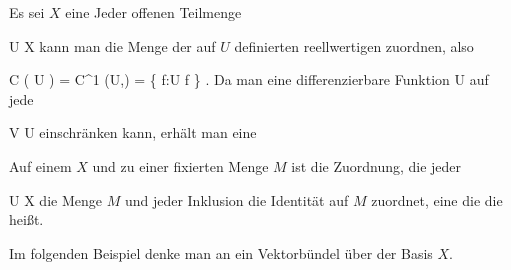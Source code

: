 {





Es sei $X$ eine
Jeder offenen Teilmenge

\mavergleichskette
{\vergleichskette
{U
}
{ \subseteq }{ X
}
{  }{
}
{    }{
}
{   }{
}
}
{}{}{}
kann man die Menge der auf $U$ definierten reellwertigen
zuordnen, also

\mavergleichskettedisp
{\vergleichskette
{ { \mathcal  C   }  \left(   U   \right)
}
{ =} { C^1 (U,\R)
}
{ =} { \left\{  f:U \rightarrow \R  \mid  f          \right\}
}
{ } {
}
{ } {
}
}
{}{}{.}
Da man eine differenzierbare Funktion
 { U } { \R
} {}
auf jede

\mavergleichskette
{\vergleichskette
{V
}
{ \subseteq }{ U
}
{  }{
}
{    }{
}
{   }{
}
}
{}{}{}
einschränken kann, erhält man eine





}

{





Auf einem
$X$ und zu einer fixierten Menge $M$ ist die Zuordnung, die jeder

\mavergleichskette
{\vergleichskette
{U
}
{ \subseteq }{ X
}
{  }{
}
{    }{
}
{   }{
}
}
{}{}{}
die Menge $M$ und jeder Inklusion die Identität auf $M$ zuordnet, eine
die die  {} heißt.





}

Im folgenden Beispiel denke man an ein Vektorbündel über der Basis $X$.

